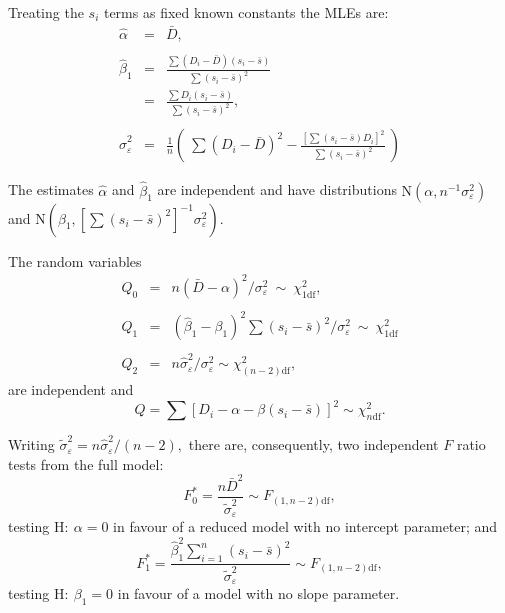 \documentclass[a4]{beamer}
\begin{document}
\begin{frame}
\alert<1>{Treating the $s_i$ terms as fixed known constants} the MLEs are:
\begin{eqnarray*}
\hat\alpha &=& \bar{D},\\ \\
\hat\beta_1 &=& \frac{ \sum (D_i-\bar{D})(s_i-\bar{s}) }{ \sum (s_i-\bar{s})^2 }\\
 &=& \frac{ \sum D_i (s_i-\bar{s}) }{ \sum (s_i-\bar{s})^2},\\ \\
\hat\sigma^2_\varepsilon &=& \frac{1}{n} (\ \sum(D_i-\bar{D})^2 - \frac{[\sum(s_i-\bar{s})D_i]^2  }{ \sum(s_i-\bar{s})^2}\ )
\end{eqnarray*}\medskip \pause\pause

The estimates $\hat\alpha$ and $\hat\beta_1$ are independent and have distributions $\mathrm{N}(\alpha, n^{-1}\sigma^2_\varepsilon)$ and $\mathrm{N}(\beta_1, [\sum(s_i-\bar{s})^2]^{-1}\sigma^2_\varepsilon).$
\end{frame}

\begin{frame}
The random variables
\begin{eqnarray*}
Q_0 &=& n(\bar{D}-\alpha)^2 / \sigma^2_\varepsilon\ \sim\ \chi^2_{1\mathrm{df}},\\ \\
Q_1 &=& (\hat\beta_1-\beta_1)^2 \sum(s_i-\bar{s})^2 / \sigma^2_\varepsilon\ \sim\ \chi^2_{1\mathrm{df}}\\ \\
Q_2 &=& n\hat\sigma^2_\varepsilon / \sigma^2_\varepsilon\sim \chi^2_{(n-2)\mathrm{df}},
\end{eqnarray*}
are independent and
\[
Q=\sum [ D_i - \alpha - \beta(s_i - \bar{s}) ]^2 \sim \chi^2_{n\mathrm{df}}.
\]
\end{frame}

\begin{frame}
Writing $\tilde\sigma^2_\varepsilon = n \hat\sigma^2_\varepsilon / (n-2),$ there are, consequently, two independent $F$ ratio tests from the full model:
\[
F_0^\ast = \frac{n\bar{D}^2}{\tilde\sigma^2_\varepsilon} \sim F_{(1,n-2)\mathrm{df}} ,
\]
testing $\textrm{H}\colon\ \alpha=0$ in favour of a reduced model with no intercept parameter; and
\[
F_1^\ast = \frac{ \hat\beta_1^2 \sum\limits_{i=1}^{n}(s_i-\bar{s})^2 }{ \tilde\sigma^2_\varepsilon } \sim F_{(1,n-2)\mathrm{df}} ,
\]
testing $\textrm{H}\colon\ \beta_1=0$ in favour of a model with no slope parameter.
\end{frame}
\end{document}
